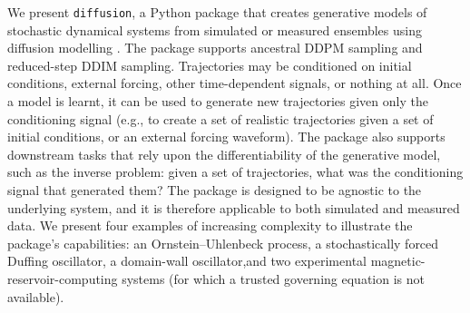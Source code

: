 We present \texttt{diffusion}, a Python package that creates generative models of stochastic dynamical systems from simulated or measured ensembles using diffusion modelling \cite{sohldickstein2015,ho2020ddpm,song2021ddim}. The package supports ancestral DDPM sampling and reduced-step DDIM sampling. Trajectories may be conditioned on initial conditions, external forcing, other time-dependent signals, or nothing at all. Once a model is learnt, it can be used to generate new trajectories given only the conditioning signal (e.g., to create a set of realistic trajectories given a set of initial conditions, or an external forcing waveform). The package also supports downstream tasks that rely upon the differentiability of the generative model, such as the inverse problem: given a set of trajectories, what was the conditioning signal that generated them? The package is designed to be agnostic to the underlying system, and it is therefore applicable to both simulated and measured data. We present four examples of increasing complexity to illustrate the package's capabilities: an Ornstein--Uhlenbeck process, a stochastically forced Duffing oscillator, a domain-wall oscillator,and two experimental magnetic-reservoir-computing systems (for which a trusted governing equation is not available).
